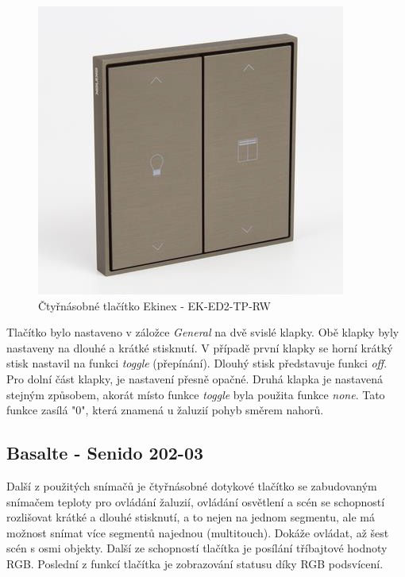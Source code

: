 \begin{figure}[!ht]
  \begin{center}
    \includegraphics[scale=0.6]{obrazky/Ekinex.png}
  \end{center}
  \caption[Čtyřnásobné tlačítko Ekinex - EK-ED2-TP-RW \cite{Mitrenga}]{Čtyřnásobné tlačítko Ekinex - EK-ED2-TP-RW \cite{Mitrenga}}
  \label{fig:Čtyřnásobné tlačítko se zabudovaným teplotním senzorem Ekinex - EK-ED2-TP-RW}
\end{figure}

Tlačítko bylo nastaveno v záložce \textit{General} na dvě svislé klapky. Obě klapky byly nastaveny na dlouhé a krátké stisknutí. V případě první klapky se horní krátký stisk nastavil na funkci \textit{toggle} (přepínání). Dlouhý stisk představuje funkci \textit{off}. Pro dolní část klapky, je nastavení přesně opačné. Druhá klapka je nastavená stejným způsobem, akorát místo funkce \textit{toggle} byla použita funkce \textit{none}. Tato funkce zasílá "0", která znamená u žaluzií pohyb směrem nahorů.

\subsection{Basalte - Senido 202-03}
Další z použitých snímačů je čtyřnásobné dotykové tlačítko se zabudovaným snímačem teploty pro ovládání žaluzií, ovládání osvětlení a scén se schopností rozlišovat krátké a dlouhé stisknutí, a to nejen na jednom segmentu, ale má možnost snímat více segmentů najednou (multitouch). Dokáže ovládat, až šest scén s osmi objekty. Další ze schopností tlačítka je posílání tříbajtové hodnoty RGB. Poslední z funkcí tlačítka je zobrazování statusu díky RGB podsvícení. \cite{Basalte}

